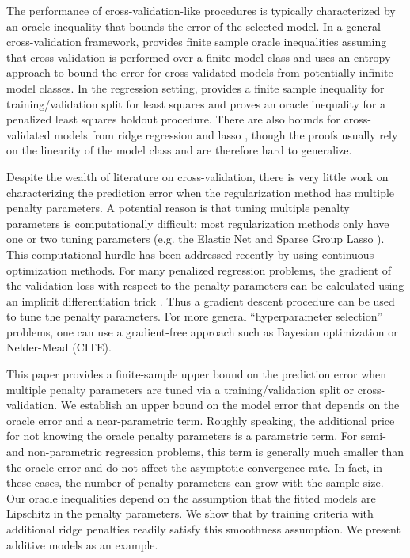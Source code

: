 \documentclass[12pt]{article}
\begin{document}
The performance of cross-validation-like procedures is typically characterized by an oracle inequality that bounds the error of the selected model. In a general cross-validation framework, \citet{van2003unified, van2004asymptotic} provides finite sample oracle inequalities assuming that cross-validation is performed over a finite model class and \citet{lecue2012oracle} uses an entropy approach to bound the error for cross-validated models from potentially infinite model classes. In the regression setting, \citet{gyorfi2006distribution} provides a finite sample inequality for training/validation split for least squares and \citet{wegkamp2003model} proves an oracle inequality for a penalized least squares holdout procedure. There are also bounds for cross-validated models from ridge regression and lasso \citep{golub1979generalized, chetverikov2016cross, chatterjee2015prediction}, though the proofs usually rely on the linearity of the model class and are therefore hard to generalize.

Despite the wealth of literature on cross-validation, there is very little work on characterizing the prediction error when the regularization method has multiple penalty parameters. A potential reason is that tuning multiple penalty parameters is computationally difficult; most regularization methods only have one or two tuning parameters (e.g. the Elastic Net and Sparse Group Lasso \citep{zou2003regression, simon2013sparse}). This computational hurdle has been addressed recently by using continuous optimization methods. For many penalized regression problems, the gradient of the validation loss with respect to the penalty parameters can be calculated using an implicit differentiation trick \citep{bengio2000gradient, foo2008efficient}. Thus a gradient descent procedure can be used to tune the penalty parameters. For more general ``hyperparameter selection'' problems, one can use a gradient-free approach such as Bayesian optimization \citet{snoek2012practical} or Nelder-Mead (CITE).

This paper provides a finite-sample upper bound on the prediction error when multiple penalty parameters are tuned via a training/validation split or cross-validation. We establish an upper bound on the model error that depends on the oracle error and a near-parametric term. Roughly speaking, the additional price for not knowing the oracle penalty parameters is a parametric term. For semi- and non-parametric regression problems, this term is generally much smaller than the oracle error and do not affect the asymptotic convergence rate. In fact, in these cases, the number of penalty parameters can grow with the sample size. Our oracle inequalities depend on the assumption that the fitted models are Lipschitz in the penalty parameters. We show that by training criteria with additional ridge penalties readily satisfy this smoothness assumption. We present additive models as an example.
\end{document}
